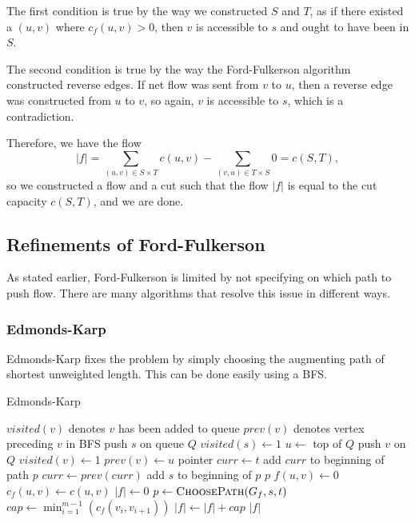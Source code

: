 The first condition is true by the way we constructed $S$ and $T$, as if there existed a $(u,v)$ where $c_f(u,v) > 0$, then $v$ is accessible to $s$ and ought to have been in $S$.

The second condition is true by the way the Ford-Fulkerson algorithm constructed reverse edges. If net flow was sent from $v$ to $u$, then a reverse edge was constructed from $u$ to $v$, so again, $v$ is accessible to $s$, which is a contradiction.

Therefore, we have the flow
\[|f|=\sum_{(u,v) \in S \times T} c(u,v) - \sum_{(v,u) \in T \times S} 0 = c(S,T),\]
so we constructed a flow and a cut such that the flow $|f|$ is equal to the cut capacity $c(S,T)$, and we are done.

\subsection{Refinements of Ford-Fulkerson}

As stated earlier, Ford-Fulkerson is limited by not specifying on which path to push flow. There are many algorithms that resolve this issue in different ways.

\subsubsection{Edmonds-Karp}

Edmonds-Karp fixes the problem by simply choosing the augmenting path of shortest unweighted length. This can be done easily using a BFS.

\begin{algorithm}[H]
\caption{Edmonds-Karp}
\begin{algorithmic}
	\State $visited(v)$ denotes $v$ has been added to queue
	\State $prev(v)$ denotes vertex preceding $v$ in BFS
	\State push $s$ on queue $Q$
	\State $visited(s) \gets 1$
		\State $u \gets $ top of $Q$
			\State push $v$ on $Q$
			\State $visited(v) \gets 1$
			\State $prev(v) \gets u$
		\EndFor
	\EndWhile
	\State pointer $curr \gets t$
		\State add $curr$ to beginning of path $p$
		\State $curr \gets prev(curr)$
	\EndWhile
	\State add $s$ to beginning of $p$
	\State \Return $p$
\EndFunction
{}
		\State $f(u,v) \gets 0$
		\State $c_f(u,v) \gets c(u,v)$
	\EndFor
	\State $|f| \gets 0$
		\State $p \gets \Call{ChoosePath}{G_f,s,t}$
		\State $cap \gets \min_{i=1}^{m-1}(c_f(v_i,v_{i+1}))$
		\State $|f| \gets |f| + cap$
		\State {}
	\EndWhile
	\Return $|f|$
\EndFunction
\end{algorithmic}
\end{algorithm}

